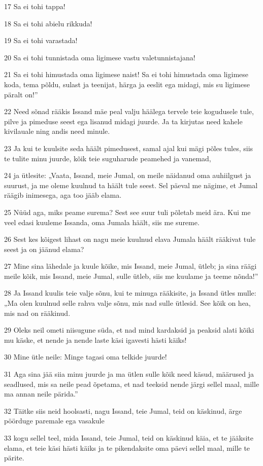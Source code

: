 \par 17 Sa ei tohi tappa!
\par 18 Sa ei tohi abielu rikkuda!
\par 19 Sa ei tohi varastada!
\par 20 Sa ei tohi tunnistada oma ligimese vastu valetunnistajana!
\par 21 Sa ei tohi himustada oma ligimese naist! Sa ei tohi himustada oma ligimese koda, tema põldu, sulast ja teenijat, härga ja eeslit ega midagi, mis su ligimese päralt on!”
\par 22 Need sõnad rääkis Issand mäe peal valju häälega tervele teie kogudusele tule, pilve ja pimeduse seest ega lisanud midagi juurde. Ja ta kirjutas need kahele kivilauale ning andis need minule.
\par 23 Ja kui te kuulsite seda häält pimedusest, samal ajal kui mägi põles tules, siis te tulite minu juurde, kõik teie suguharude peamehed ja vanemad,
\par 24 ja ütlesite: „Vaata, Issand, meie Jumal, on meile näidanud oma auhiilgust ja suurust, ja me oleme kuulnud ta häält tule seest. Sel päeval me nägime, et Jumal räägib inimesega, aga too jääb elama.
\par 25 Nüüd aga, miks peame surema? Sest see suur tuli põletab meid ära. Kui me veel edasi kuuleme Issanda, oma Jumala häält, siis me sureme.
\par 26 Sest kes kõigest lihast on nagu meie kuulnud elava Jumala häält rääkivat tule seest ja on jäänud elama?
\par 27 Mine sina lähedale ja kuule kõike, mis Issand, meie Jumal, ütleb; ja sina räägi meile kõik, mis Issand, meie Jumal, sulle ütleb, siis me kuulame ja teeme nõnda!”
\par 28 Ja Issand kuulis teie valje sõnu, kui te minuga rääkisite, ja Issand ütles mulle: „Ma olen kuulnud selle rahva valje sõnu, mis nad sulle ütlesid. See kõik on hea, mis nad on rääkinud.
\par 29 Oleks neil ometi niisugune süda, et nad mind kardaksid ja peaksid alati kõiki mu käske, et nende ja nende laste käsi igavesti hästi käiks!
\par 30 Mine ütle neile: Minge tagasi oma telkide juurde!
\par 31 Aga sina jää siia minu juurde ja ma ütlen sulle kõik need käsud, määrused ja seadlused, mis sa neile pead õpetama, et nad teeksid nende järgi sellel maal, mille ma annan neile pärida.”
\par 32 Täitke siis neid hoolsasti, nagu Issand, teie Jumal, teid on käskinud, ärge pöörduge paremale ega vasakule
\par 33 kogu sellel teel, mida Issand, teie Jumal, teid on käskinud käia, et te jääksite elama, et teie käsi hästi käiks ja te pikendaksite oma päevi sellel maal, mille te pärite.

